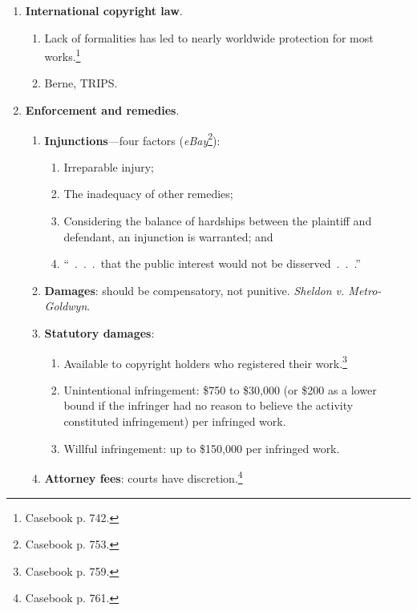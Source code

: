 \begin{enumerate}
\begin{enumerate}
\begin{enumerate}
        \end{enumerate}
    \end{enumerate}
    \item \textbf{International copyright law}.
    \begin{enumerate}
        \item Lack of formalities has led to nearly worldwide protection for 
        most works.\footnote{Casebook p. 742.}
        \item Berne, TRIPS.
    \end{enumerate}
    \item \textbf{Enforcement and remedies}.
    \begin{enumerate}
        \item \textbf{Injunctions}---four factors 
        (\emph{eBay}\footnote{Casebook p. 753.}):
        \begin{enumerate}
            \item Irreparable injury;
            \item The inadequacy of other remedies;
            \item Considering the balance of hardships between the plaintiff 
            and defendant, an injunction is warranted; and
            \item ``~.~.~.~that the public interest would not be 
            disserved~.~.~.''
        \end{enumerate}
        \item \textbf{Damages}: should be compensatory, not punitive.  
        \emph{Sheldon v. Metro-Goldwyn}.
        \item \textbf{Statutory damages}:
        \begin{enumerate}
            \item Available to copyright holders who registered their 
            work.\footnote{Casebook p. 759.}
            \item Unintentional infringement: \$750 to \$30,000 (or \$200 as a 
            lower bound if the infringer had no reason to believe the activity 
            constituted infringement) per infringed work.
            \item Willful infringement: up to \$150,000 per infringed work.
        \end{enumerate}
        \item \textbf{Attorney fees}: courts have 
        discretion.\footnote{Casebook p. 761.}
    \end{enumerate}
\end{enumerate}

